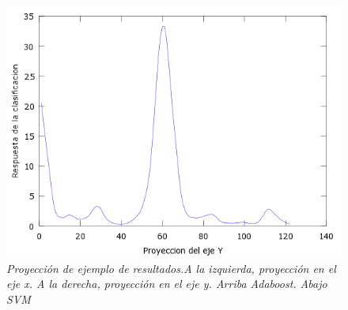 \begin{figure}[H]
  \includegraphics[scale=.4]{images/plots/svm7Y}
  \caption{\em  Proyección de ejemplo de resultados.A la izquierda, proyección en el eje x. A la derecha, proyección en el eje y. Arriba Adaboost. Abajo SVM}   
  \label{fig:pro7}
\end{figure}
